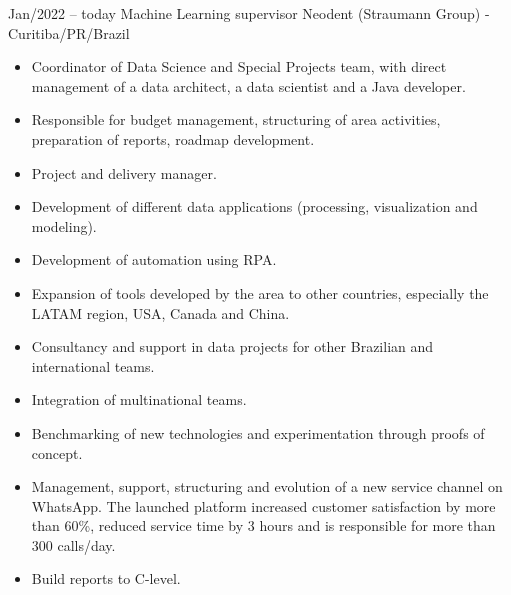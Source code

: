 \documentclass[9pt]{developercv} %
\begin{document}
	\begin{entrylist}
		\entry
		{Jan/2022 -- today}
		{Machine Learning supervisor}
		{Neodent (Straumann Group) - Curitiba/PR/Brazil}
		{\vspace{-10pt}
			\begin{itemize}[noitemsep,topsep=0pt,parsep=0pt,partopsep=0pt, leftmargin=-1pt]
				\item Coordinator of Data Science and Special Projects team, with direct management of a data architect, a data scientist and a Java developer.
				\item Responsible for budget management, structuring of area activities, preparation of reports, roadmap development.
				\item Project and delivery manager.
				\item Development of different data applications (processing, visualization and modeling).
				\item Development of automation using RPA.
				\item Expansion of tools developed by the area to other countries, especially the LATAM region, USA, Canada and China.
				\item Consultancy and support in data projects for other Brazilian and international teams.
				\item Integration of multinational teams.
				\item Benchmarking of new technologies and experimentation through proofs of concept.
				\item Management, support, structuring and evolution of a new service channel on WhatsApp. The launched platform increased customer satisfaction by more than 60\%, reduced service time by 3 hours and is responsible for more than 300 calls/day.
				\item Build reports to C-level.
				

\end{itemize}}
\end{entrylist}
\end{document}
